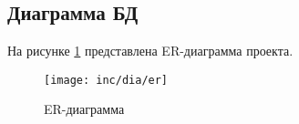
\subsection{Диаграмма БД}
На рисунке \ref{fig:er} представлена ER-диаграмма проекта.
\begin{landscape}
\begin{figure}
  \centering
  \texttt{[image: inc/dia/er]}
  \caption{ER-диаграмма}
  \label{fig:er}
\end{figure}
\end{landscape}
\cite{cha:analysis}







